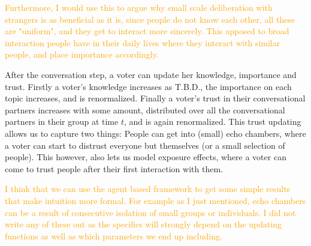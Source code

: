 \textcolor{orange}{
Furthermore, I would use this to argue why small scale deliberation with strangers is as beneficial as it is, since people do not know each other, all these are "uniform", and they get to interact more sincerely. This apposed to broad interaction people have in their daily lives where they interact with similar people, and place importance accordingly.
}

After the conversation step, a voter can update her knowledge, importance and trust. Firstly a voter's knowledge increases as T.B.D., the importance on each topic increases, and is renormalized. Finally a voter's trust in their conversational partners increases with some amount, distributed over all the conversational partners in their group at time $t$, and is again renormalized. This trust updating allows us to capture two things: People can get into (small) echo chambers, where a voter can start to distrust everyone but themselves (or a small selection of people). This however, also lets us model exposure effects, where a voter can come to trust people after their first interaction with them.

\textcolor{orange}{
	I think that we can use the agent based framework to get some simple results that make intuition more formal. For example as I just mentioned, echo chambers can be a result of consecutive isolation of small groups or individuals. I did not write any of these out as the specifics will strongly depend on the updating functions as well as which parameters we end up including. 
}
